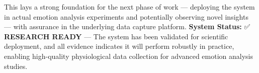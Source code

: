 This lays a strong foundation for the next phase of work --- deploying the system in actual emotion analysis experiments and potentially observing novel insights --- with assurance in the underlying data capture platform. \textbf{System Status:} ✅ \textbf{RESEARCH READY} --- The system has been validated for scientific deployment, and all evidence indicates it will perform robustly in practice, enabling high-quality physiological data collection for advanced emotion analysis studies. 